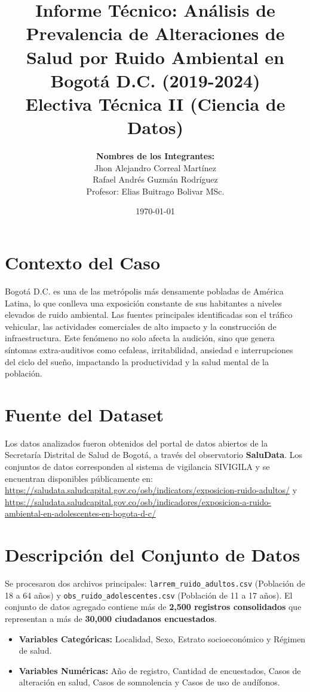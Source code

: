 \documentclass[11pt,a4paper]{article}
\title{
    \vspace{-2cm}
    \textbf{Informe Técnico: Análisis de Prevalencia de Alteraciones de Salud por Ruido Ambiental en Bogotá D.C. (2019-2024)} \\
    \large Electiva Técnica II (Ciencia de Datos)
}
\author{
    \textbf{Nombres de los Integrantes:} \\
    Jhon Alejandro Correal Martínez\\
    Rafael Andrés Guzmán Rodríguez \\
    \vspace{0.3cm}
    \small Profesor: Elias Buitrago Bolivar MSc.
}
\date{\today}
\begin{document}
\maketitle

\section{Contexto del Caso}
Bogotá D.C. es una de las metrópolis más densamente pobladas de América Latina, lo que conlleva una exposición constante de sus habitantes a niveles elevados de ruido ambiental. Las fuentes principales identificadas son el tráfico vehicular, las actividades comerciales de alto impacto y la construcción de infraestructura. Este fenómeno no solo afecta la audición, sino que genera síntomas extra-auditivos como cefaleas, irritabilidad, ansiedad e interrupciones del ciclo del sueño, impactando la productividad y la salud mental de la población.

\section{Fuente del Dataset}
Los datos analizados fueron obtenidos del portal de datos abiertos de la Secretaría Distrital de Salud de Bogotá, a través del observatorio \textbf{SaluData}. Los conjuntos de datos corresponden al sistema de vigilancia SIVIGILA y se encuentran disponibles públicamente en: 
\url{https://saludata.saludcapital.gov.co/osb/indicators/exposicion-ruido-adultos/} y \url{https://saludata.saludcapital.gov.co/osb/indicadores/exposicion-a-ruido-ambiental-en-adolescentes-en-bogota-d-c/}

\section{Descripción del Conjunto de Datos}
Se procesaron dos archivos principales: \texttt{larrem\_ruido\_adultos.csv} (Población de 18 a 64 años) y \texttt{obs\_ruido\_adolescentes.csv} (Población de 11 a 17 años). El conjunto de datos agregado contiene más de \textbf{2,500 registros consolidados} que representan a más de \textbf{30,000 ciudadanos encuestados}. 
\begin{itemize}
    \item \textbf{Variables Categóricas:} Localidad, Sexo, Estrato socioeconómico y Régimen de salud.
    \item \textbf{Variables Numéricas:} Año de registro, Cantidad de encuestados, Casos de alteración en salud, Casos de somnolencia y Casos de uso de audífonos.
\end{itemize}
\end{document}
